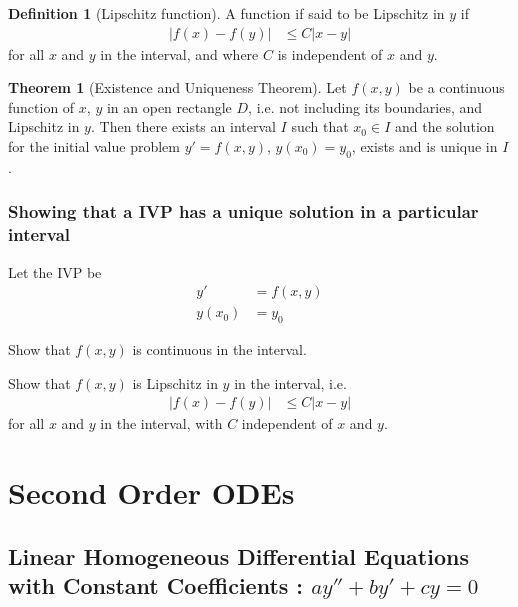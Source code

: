 \documentclass[fleqn, a4paper, 8pt, twoside]{amsart}
\theoremstyle{definition}
\newtheorem{definition}{Definition}
\theoremstyle{theorem}
\newtheorem{theorem}{Theorem}
\begin{document}
\begin{multicols}{2}
\begin{spacing}{0.85}
\begin{definition}[Lipschitz function]
	A function if said to be Lipschitz in $y$ if
	\begin{align*}
		\left| f(x) - f(y) \right| &\le C |x - y|
	\end{align*}
	for all $x$ and $y$ in the interval, and where $C$ is independent of $x$ and $y$.
\end{definition}

\begin{theorem}[Existence and Uniqueness Theorem]
	Let $f(x,y)$ be a continuous function of $x$, $y$ in an open rectangle $D$, i.e. not including its boundaries, and Lipschitz in $y$.
	Then there exists an interval $I$ such that $x_0 \in I$ and the solution for the initial value problem $y' = f(x,y)$, $y(x_0) = y_0$, exists and is unique in $I$.
\end{theorem}

\subsubsection{Showing that a IVP has a unique solution in a particular interval}

\begin{algorithmic}[1]
	\item
		Let the IVP be
		\begin{align*}
			y' &= f(x,y)\\
			y(x_0) &= y_0
		\end{align*}
	\item
		Show that $f(x,y)$ is continuous in the interval.
	\item
		Show that $f(x,y)$ is Lipschitz in $y$ in the interval, i.e.
		\begin{align*}
			\left| f(x) - f(y) \right| &\le C |x - y|
		\end{align*}
		for all $x$ and $y$ in the interval, with $C$ independent of $x$ and $y$.
\end{algorithmic}

\section{Second Order ODEs}

\subsection{Linear Homogeneous Differential Equations with Constant Coefficients : $a y'' + b y' + c y = 0$}


\end{spacing}
\end{multicols}
\end{document}

